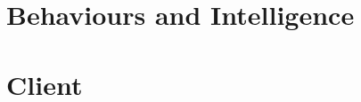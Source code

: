 \documentclass[10pt, a4paper, conference, compsocconf]{IEEEtran}
\begin{document}
\section{Behaviours and Intelligence \label{behaviours}}

\section{Client \label{client}}


%
%



%
%
\end{document}
